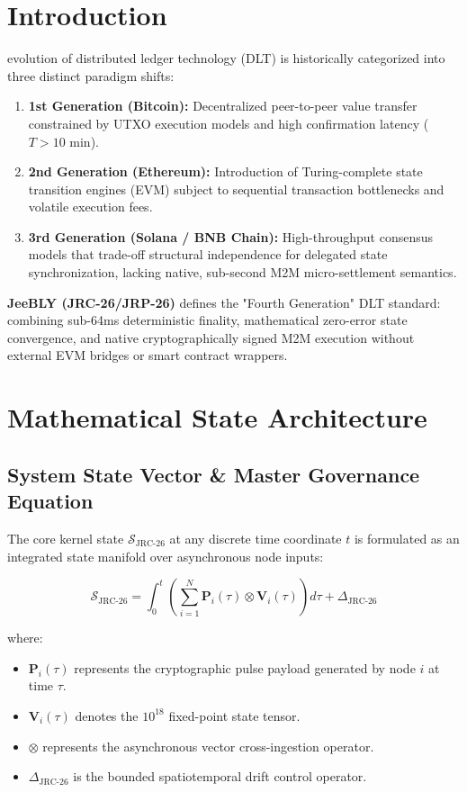 \documentclass[10pt,journal,compsoc]{IEEEtran}
\begin{document}
\section{Introduction}
 evolution of distributed ledger technology (DLT) is historically categorized into three distinct paradigm shifts:
\begin{enumerate}
    \item \textbf{1st Generation (Bitcoin):} Decentralized peer-to-peer value transfer constrained by UTXO execution models and high confirmation latency ($T > 10\text{ min}$).
    \item \textbf{2nd Generation (Ethereum):} Introduction of Turing-complete state transition engines (EVM) subject to sequential transaction bottlenecks and volatile execution fees.
    \item \textbf{3rd Generation (Solana / BNB Chain):} High-throughput consensus models that trade-off structural independence for delegated state synchronization, lacking native, sub-second M2M micro-settlement semantics.
\end{enumerate}

\textbf{JeeBLY (JRC-26/JRP-26)} defines the "Fourth Generation" DLT standard: combining sub-64ms deterministic finality, mathematical zero-error state convergence, and native cryptographically signed M2M execution without external EVM bridges or smart contract wrappers.

\section{Mathematical State Architecture}

\subsection{System State Vector \& Master Governance Equation}
The core kernel state $\mathcal{S}_{\text{JRC-26}}$ at any discrete time coordinate $t$ is formulated as an integrated state manifold over asynchronous node inputs:

\begin{equation}
\mathcal{S}_{\text{JRC-26}} = \int_{0}^{t} \left( \sum_{i=1}^{N} \mathbf{P}_i(\tau) \otimes \mathbf{V}_i(\tau) \right) d\tau + \Delta_{\text{JRC-26}}
\end{equation}

where:
\begin{itemize}
    \item $\mathbf{P}_i(\tau)$ represents the cryptographic pulse payload generated by node $i$ at time $\tau$.
    \item $\mathbf{V}_i(\tau)$ denotes the $10^{18}$ fixed-point state tensor.
    \item $\otimes$ represents the asynchronous vector cross-ingestion operator.
    \item $\Delta_{\text{JRC-26}}$ is the bounded spatiotemporal drift control operator.
\end{itemize}
\end{document}
